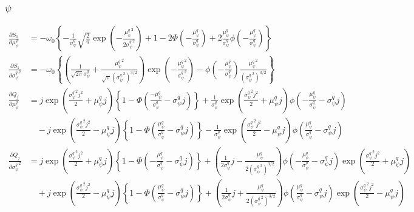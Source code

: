 \documentclass[11pt]{article}
\begin{document}
\subsubsection{$\psi$}
\begin{align*}
  \frac{\partial S_{1}}{\partial \mu_{\psi}^{q}} &= -\omega_{0}\left\{-\frac{1}{\sigma_{\psi}^{q}}\sqrt{\frac{2}{\pi}}\exp\left(-\frac{{\mu_{\psi}^{q}}^{2}}{2{\sigma_{\psi}^{q}}^{2}} \right) + 1 -2\Phi\left(-\frac{\mu_{\psi}^{q}}{\sigma_{\psi}^{q}}\right)+2\frac{\mu_{\psi}^{q}}{\sigma_{\psi}^{q}}\phi\left(-\frac{\mu_{\psi}^{q}}{\sigma_{\psi}^{q}}\right) \right\}\\
  \frac{\partial S_{1}}{\partial {\sigma_{\psi}^{q}}^{2}} &= -\omega_{0}\left\{\left(\frac{1}{\sqrt{2\pi}\sigma_{\psi}^{q}}+\frac{{\mu_{\psi}^{q}}^{2}}{\sqrt{\pi}\left({\sigma_{\psi}^{q}}^{2} \right)^{3/2}} \right)\exp\left(-\frac{{\mu_{\psi}^{q}}^{2}}{{\sigma_{\psi}^{q}}^{2}} \right) -\phi\left(-\frac{\mu_{\psi}^{q}}{\sigma_{\psi}^{q}}\right)\frac{{\mu_{\psi}^{q}}^{2}}{\left({\sigma_{\psi}^{q}}^{2} \right)^{3/2}} \right\}\\
  \frac{\partial Q_{j}}{\partial \mu_{\psi}^{q}} &= j\exp\left(\frac{{\sigma_{\psi}^{q}}^{2}j^{2}}{2} +\mu_{\psi}^{q}j \right)\left\{1-\Phi\left(\frac{-\mu_{\psi}^{q}}{\sigma_{\psi}^{q}}-\sigma_{\psi}^{q}j\right) \right\}+\frac{1}{\sigma_{\psi}^{q}}\exp\left(\frac{{\sigma_{\psi}^{q}}^{2}j^{2}}{2}+\mu_{\psi}^{q}j \right)\phi\left(-\frac{\mu_{\psi}^{q}}{\sigma_{\psi}^{q}}-\sigma_{\psi}^{q}j\right)\\
  &\quad -j\exp\left(\frac{{\sigma_{\psi}^{q}}^{2}j^{2}}{2} -\mu_{\psi}^{q}j \right)\left\{1-\Phi\left(\frac{\mu_{\psi}^{q}}{\sigma_{\psi}^{q}}-\sigma_{\psi}^{q}j\right) \right\}-\frac{1}{\sigma_{\psi}^{q}}\exp\left(\frac{{\sigma_{\psi}^{q}}^{2}j^{2}}{2}-\mu_{\psi}^{q}j \right)\phi\left(\frac{\mu_{\psi}^{q}}{\sigma_{\psi}^{q}}-\sigma_{\psi}^{q}j\right)\\
  \frac{\partial Q_{j}}{\partial {\sigma_{\psi}^{q}}^{2}} &= j\exp\left(\frac{{\sigma_{\psi}^{q}}^{2}j^{2}}{2}+\mu_{\psi}^{q}j \right)\left\{1-\Phi\left(-\frac{\mu_{\psi}^{q}}{\sigma_{\psi}^{q}}-\sigma_{\psi}^{q}j\right) \right\}+\left(\frac{1}{2\sigma_{\psi}^{q}}j -\frac{\mu_{\psi}^{q}}{2\left({\sigma_{\psi}^{q}}^{2} \right)^{3/2}}\right)\phi\left(-\frac{\mu_{\psi}^{q}}{\sigma_{\psi}^{q}}-\sigma_{\psi}^{q}j\right)\exp\left(\frac{{\sigma_{\psi}^{q}}^{2}j^{2}}{2} +\mu_{\psi}^{q}j \right)\\
  &\quad +j\exp\left(\frac{{\sigma_{\psi}^{q}}^{2}j^{2}}{2}-\mu_{\psi}^{q}j \right)\left\{1-\Phi\left(\frac{\mu_{\psi}^{q}}{\sigma_{\psi}^{q}}-\sigma_{\psi}^{q}j\right) \right\}+\left(\frac{1}{2\sigma_{\psi}^{q}}j +\frac{\mu_{\psi}^{q}}{2\left({\sigma_{\psi}^{q}}^{2} \right)^{3/2}}\right)\phi\left(\frac{\mu_{\psi}^{q}}{\sigma_{\psi}^{q}}-\sigma_{\psi}^{q}j\right)\exp\left(\frac{{\sigma_{\psi}^{q}}^{2}j^{2}}{2} -\mu_{\psi}^{q}j \right)\\

\end{align*}
\end{document}
